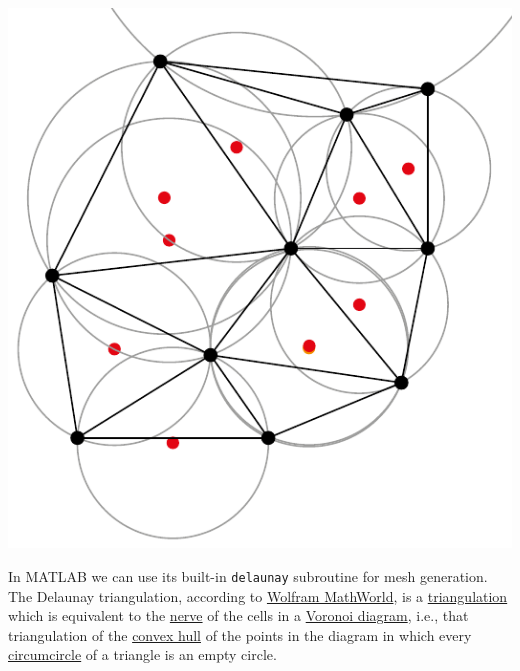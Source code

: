 	\begin{minipage}{.2\textwidth}
		\includegraphics[width=1\linewidth]{
			svg/Delaunay_circumcircles_centers}
	\end{minipage}\hfill
	\begin{minipage}{.75\textwidth}
		\hspace{3ex}In MATLAB we can use its built-in \texttt{delaunay} 
		subroutine for mesh generation.
		The Delaunay triangulation, according to		
		\href{https://mathworld.wolfram.com/DelaunayTriangulation.html}{
			Wolfram MathWorld},	is a 
		\href{https://mathworld.wolfram.com/Triangulation.html}{triangulation} 
		which is equivalent to the
		\href{https://mathworld.wolfram.com/Nerve.html}{nerve} 
		of the cells in a 
		\href{https://mathworld.wolfram.com/VoronoiDiagram.html}{
			Voronoi diagram}, i.e., that triangulation of the 
		\href{https://mathworld.wolfram.com/ConvexHull.html}{convex hull} of 
		the points in the diagram in which every 
		\href{https://mathworld.wolfram.com/Circumcircle.html}{circumcircle}
		of a triangle is an empty circle.
	\end{minipage}
	

